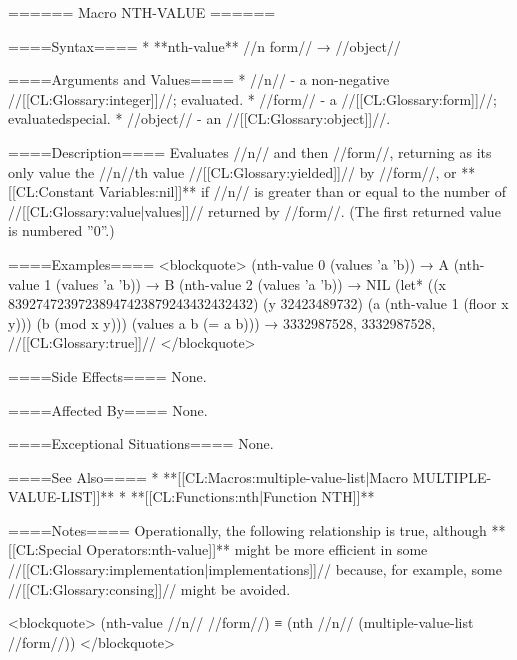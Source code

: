 ====== Macro NTH-VALUE ======

====Syntax====
  * **nth-value** //n form// → //object//

====Arguments and Values====
  * //n// - a non-negative //[[CL:Glossary:integer]]//; evaluated.
  * //form// - a //[[CL:Glossary:form]]//; evaluatedspecial.
  * //object// - an //[[CL:Glossary:object]]//.

====Description====
Evaluates //n// and then //form//, returning as its only value the //n//th value //[[CL:Glossary:yielded]]// by //form//, or **[[CL:Constant Variables:nil]]** if //n// is greater than or equal to the number of //[[CL:Glossary:value|values]]// returned by //form//. (The first returned value is numbered ''0''.)

====Examples====
<blockquote> (nth-value 0 (values 'a 'b)) → A (nth-value 1 (values 'a 'b)) → B (nth-value 2 (values 'a 'b)) → NIL (let* ((x 83927472397238947423879243432432432) (y 32423489732) (a (nth-value 1 (floor x y))) (b (mod x y))) (values a b (= a b))) → 3332987528, 3332987528, //[[CL:Glossary:true]]// </blockquote>

====Side Effects====
None.

====Affected By====
None.

====Exceptional Situations====
None.

====See Also====
  * **[[CL:Macros:multiple-value-list|Macro MULTIPLE-VALUE-LIST]]**
  * **[[CL:Functions:nth|Function NTH]]**

====Notes====
Operationally, the following relationship is true, although **[[CL:Special Operators:nth-value]]** might be more efficient in some //[[CL:Glossary:implementation|implementations]]// because, for example, some //[[CL:Glossary:consing]]// might be avoided.

<blockquote> (nth-value //n// //form//) ≡ (nth //n// (multiple-value-list //form//)) </blockquote>

